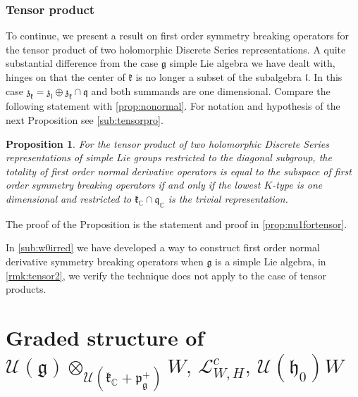 \documentclass[12pt]{amsart}
\newtheorem{prop}[thm]{Proposition}
\theoremstyle{definition}
\theoremstyle{remark}
\newcommand{\g}{\mathfrak{g}}
\newcommand{\h}{\mathfrak{h}}
\renewcommand{\k}{{\mathfrak k}}
\renewcommand{\l}{\mathfrak l}
\newcommand{\p}{\mathfrak p}
\newcommand{\q}{\mathfrak q}
\newcommand{\z}{\mathfrak z}
\newcommand{\C}{{\mathbb C}}
\numberwithin{equation}{section}
\begin{document}
\subsubsection{Tensor product} To continue, we present a result on first order symmetry breaking operators for the tensor product of two holomorphic Discrete Series representations. A quite substantial difference from the case $\g$ simple Lie algebra we have dealt with, hinges on that the center of $\k $ is no longer a subset of the subalgebra $\l$. In this case $\z_\k=\z_\l \oplus   \z_\k \cap \q$ and both summands are one dimensional.   Compare the following statement with \ref{prop:nonormal}. For notation and hypothesis of the next Proposition see \ref{sub:tensorpro}.
\begin{prop}For the tensor product of two holomorphic Discrete Series representations of simple Lie groups restricted to the diagonal subgroup, the totality of first order normal derivative operators is equal to the subspace of first order symmetry breaking operators if and only if the lowest $K$-type is one dimensional and restricted to   $\k_\C\cap \q_\C$   is the trivial representation.
\end{prop} The proof of the Proposition is the statement and proof in  \ref{prop:nu1fortensor}.

In \ref{sub:w0irred} we have developed a way to construct first order normal derivative symmetry breaking operators when $\g$ is a simple Lie algebra, in \ref{rmk:tensor2}, we verify the technique does not apply to the case of tensor products.

  \section{Graded structure  of   $\mathcal U(\g)\otimes_{\mathcal U(\k_\C +\p_\g ^+)} W, \,\mathcal L_{W,H}^c, \, \mathcal U(\h_0)W$ }\label{sec:algebraic}
\end{document}
